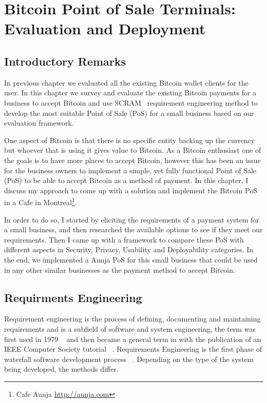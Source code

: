 
\chapter{Bitcoin Point of Sale Terminals: Evaluation and Deployment}


\section{Introductory Remarks}

In previous chapter we evaluated all the existing Bitcoin wallet clients for the user. In this chapter we survey and evaluate the existing Bitcoin payments for a business to accept Bitcoin and use SCRAM~\cite{REScenario}  requirement engineering method to develop the most suitable Point of Sale (PoS) for a small business based on our evaluation framework.

One aspect of Bitcoin is that there is no specific entity backing up the currency but whoever that is using it gives value to Bitcoin. As a Bitcoin enthusiast one of the goals is to have more places to accept Bitcoin, however this has been an issue for the business owners to implement a simple, yet fully functional Point of Sale (PoS) to be able to accept Bitcoin as a method of payment.
In this chapter, I discuss my approach to come up with a solution and implement the Bitcoin PoS in a Cafe in Montreal\footnote{ Cafe Aunja \url{http://aunja.com}}.

In order to do so, I started by eliciting the requirements of a payment system for a small business, and then researched the available options to see if they meet our requirements. Then I came up with a framework to compare these PoS with different aspects in Security, Privacy, Usability and Deployability categories. In the end, we implemented a Aunja PoS for this small business that could be used in any other similar businesses as the payment method to accept Bitcoin.

\section {Requirments Engineering}
Requirement engineering is the process of defining, documenting and maintaining requirements and is a subfield of software and system engineering, the term was first used in 1979 ~\cite{alford1979software} and then became a general term in with the publication of an IEEE Computer Society tutorial ~\cite{dorfman1990system}.
Requirements Engineering is the first phase of waterfall software development process ~\cite{rocye1970managing}. Depending on the type of the system being developed, the methods differ.

